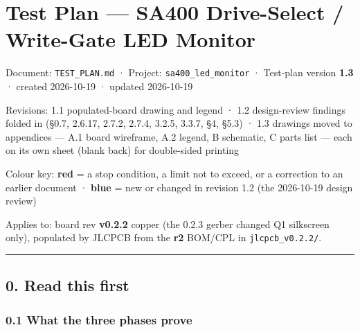\documentclass[
  10pt,
  twoside]{article}
\author{}
\date{}
\begin{document}
\hypertarget{test-plan-sa400-drive-select-write-gate-led-monitor}{%
\section{Test Plan --- SA400 Drive-Select / Write-Gate LED
Monitor}\label{test-plan-sa400-drive-select-write-gate-led-monitor}}

Document: \texttt{TEST\_PLAN.md} · Project:
\texttt{sa400\_led\_monitor} · Test-plan version
\textbf{1.3} · created 2026-10-19 · updated 2026-10-19

Revisions: 1.1 populated-board drawing and legend · 1.2
design-review findings folded in (§0.7, 2.6.17, 2.7.2,
2.7.4, 3.2.5, 3.3.7, §4, §5.3) · 1.3 drawings moved to
appendices --- A.1 board wireframe, A.2 legend, B schematic,
C parts list --- each on its own sheet (blank back) for
double-sided printing

Colour key: \textcolor[HTML]{B00000}{\textbf{red} = a stop
condition, a limit not to exceed, or a correction to an
earlier document} · \textcolor[HTML]{0040A0}{\textbf{blue} =
new or changed in revision 1.2 (the 2026-10-19 design
review)}

Applies to: board rev \textbf{v0.2.2} copper (the 0.2.3
gerber changed Q1 silkscreen only), populated by JLCPCB from
the \textbf{r2} BOM/CPL in \texttt{jlcpcb\_v0.2.2/}.

\begin{center}\rule{0.5\linewidth}{0.5pt}\end{center}

\hypertarget{read-this-first}{%
\subsection{0. Read this first}\label{read-this-first}}

\hypertarget{what-the-three-phases-prove}{%
\subsubsection{0.1 What the three phases
prove}\label{what-the-three-phases-prove}}
\end{document}
